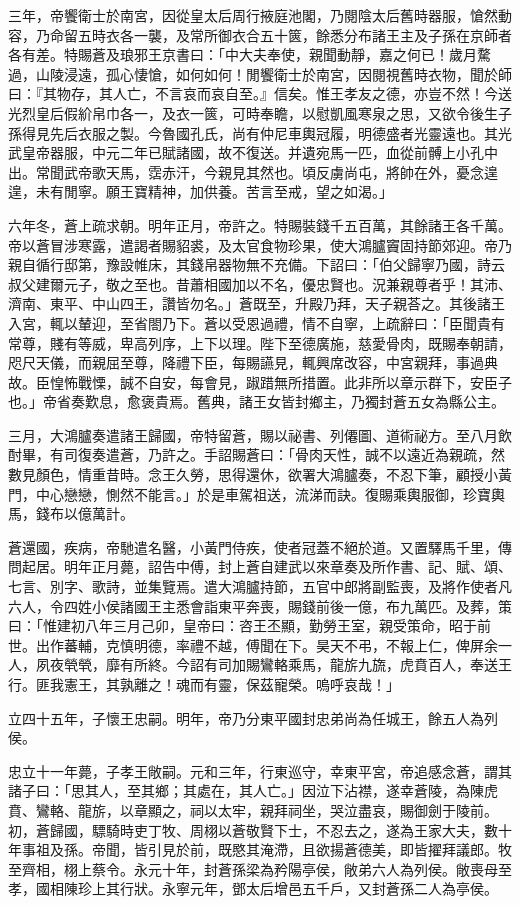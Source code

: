 \begin{pinyinscope}
三年，帝饗衛士於南宮，因從皇太后周行掖庭池閣，乃閱陰太后舊時器服，愴然動容，乃命留五時衣各一襲，及常所御衣合五十篋，餘悉分布諸王主及子孫在京師者各有差。特賜蒼及琅邪王京書曰：「中大夫奉使，親聞動靜，嘉之何已！歲月騖過，山陵浸遠，孤心悽愴，如何如何！閒饗衛士於南宮，因閱視舊時衣物，聞於師曰：『其物存，其人亡，不言哀而哀自至。』信矣。惟王孝友之德，亦豈不然！今送光烈皇后假紒帛巾各一，及衣一篋，可時奉瞻，以慰凱風寒泉之思，又欲令後生子孫得見先后衣服之製。今魯國孔氏，尚有仲尼車輿冠履，明德盛者光靈遠也。其光武皇帝器服，中元二年已賦諸國，故不復送。并遺宛馬一匹，血從前髆上小孔中出。常聞武帝歌天馬，霑赤汗，今親見其然也。頃反虜尚屯，將帥在外，憂念遑遑，未有閒寧。願王寶精神，加供養。苦言至戒，望之如渴。」

六年冬，蒼上疏求朝。明年正月，帝許之。特賜裝錢千五百萬，其餘諸王各千萬。帝以蒼冒涉寒露，遣謁者賜貂裘，及太官食物珍果，使大鴻臚竇固持節郊迎。帝乃親自循行邸第，豫設帷床，其錢帛器物無不充備。下詔曰：「伯父歸寧乃國，詩云叔父建爾元子，敬之至也。昔蕭相國加以不名，優忠賢也。況兼親尊者乎！其沛、濟南、東平、中山四王，讚皆勿名。」蒼既至，升殿乃拜，天子親荅之。其後諸王入宮，輒以輦迎，至省閤乃下。蒼以受恩過禮，情不自寧，上疏辭曰：「臣聞貴有常尊，賤有等威，卑高列序，上下以理。陛下至德廣施，慈愛骨肉，既賜奉朝請，咫尺天儀，而親屈至尊，降禮下臣，每賜讌見，輒興席改容，中宮親拜，事過典故。臣惶怖戰慄，誠不自安，每會見，踧踖無所措置。此非所以章示群下，安臣子也。」帝省奏歎息，愈褒貴焉。舊典，諸王女皆封鄉主，乃獨封蒼五女為縣公主。

三月，大鴻臚奏遣諸王歸國，帝特留蒼，賜以祕書、列僊圖、道術祕方。至八月飲酎畢，有司復奏遣蒼，乃許之。手詔賜蒼曰：「骨肉天性，誠不以遠近為親疏，然數見顏色，情重昔時。念王久勞，思得還休，欲署大鴻臚奏，不忍下筆，顧授小黃門，中心戀戀，惻然不能言。」於是車駕祖送，流涕而訣。復賜乘輿服御，珍寶輿馬，錢布以億萬計。

蒼還國，疾病，帝馳遣名醫，小黃門侍疾，使者冠蓋不絕於道。又置驛馬千里，傳問起居。明年正月薨，詔告中傅，封上蒼自建武以來章奏及所作書、記、賦、頌、七言、別字、歌詩，並集覽焉。遣大鴻臚持節，五官中郎將副監喪，及將作使者凡六人，令四姓小侯諸國王主悉會詣東平奔喪，賜錢前後一億，布九萬匹。及葬，策曰：「惟建初八年三月己卯，皇帝曰：咨王丕顯，勤勞王室，親受策命，昭于前世。出作蕃輔，克慎明德，率禮不越，傅聞在下。昊天不弔，不報上仁，俾屏余一人，夙夜煢煢，靡有所終。今詔有司加賜鸞輅乘馬，龍旂九旒，虎賁百人，奉送王行。匪我憲王，其孰離之！魂而有靈，保茲寵榮。嗚呼哀哉！」

立四十五年，子懷王忠嗣。明年，帝乃分東平國封忠弟尚為任城王，餘五人為列侯。

忠立十一年薨，子孝王敞嗣。元和三年，行東巡守，幸東平宮，帝追感念蒼，謂其諸子曰：「思其人，至其鄉；其處在，其人亡。」因泣下沾襟，遂幸蒼陵，為陳虎賁、鸞輅、龍旂，以章顯之，祠以太牢，親拜祠坐，哭泣盡哀，賜御劍于陵前。初，蒼歸國，驃騎時吏丁牧、周栩以蒼敬賢下士，不忍去之，遂為王家大夫，數十年事祖及孫。帝聞，皆引見於前，既愍其淹滯，且欲揚蒼德美，即皆擢拜議郎。牧至齊相，栩上蔡令。永元十年，封蒼孫梁為矜陽亭侯，敞弟六人為列侯。敞喪母至孝，國相陳珍上其行狀。永寧元年，鄧太后增邑五千戶，又封蒼孫二人為亭侯。


\end{pinyinscope}
